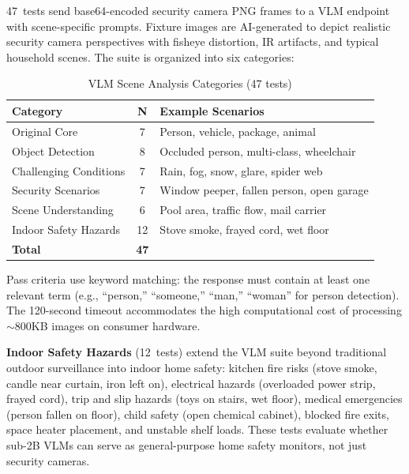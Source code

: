 \documentclass[onecolumn,10pt]{IEEEtran}
\begin{document}
47~tests send base64-encoded security camera PNG frames to a VLM
endpoint with scene-specific prompts. Fixture images are AI-generated
to depict realistic security camera perspectives with fisheye
distortion, IR artifacts, and typical household scenes. The
suite is organized into six categories:

\begin{table}[h]
\centering
\caption{VLM Scene Analysis Categories (47 tests)}
\label{tab:vlm_tests}
\begin{tabular}{p{3.2cm}cl}
\toprule
\textbf{Category} & \textbf{N} & \textbf{Example Scenarios} \\
\midrule
Original Core & 7 & Person, vehicle, package, animal \\
Object Detection & 8 & Occluded person, multi-class, wheelchair \\
Challenging Conditions & 7 & Rain, fog, snow, glare, spider web \\
Security Scenarios & 7 & Window peeper, fallen person, open garage \\
Scene Understanding & 6 & Pool area, traffic flow, mail carrier \\
Indoor Safety Hazards & 12 & Stove smoke, frayed cord, wet floor \\
\midrule
\textbf{Total} & \textbf{47} & \\
\bottomrule
\end{tabular}
\end{table}

Pass criteria use keyword matching: the response must contain at least
one relevant term (e.g., ``person,'' ``someone,'' ``man,'' ``woman''
for person detection). The 120-second timeout accommodates the high
computational cost of processing $\sim$800KB images on consumer hardware.

\textbf{Indoor Safety Hazards} (12~tests) extend the VLM suite beyond
traditional outdoor surveillance into indoor home safety: kitchen fire
risks (stove smoke, candle near curtain, iron left on), electrical
hazards (overloaded power strip, frayed cord), trip and slip hazards
(toys on stairs, wet floor), medical emergencies (person fallen on
floor), child safety (open chemical cabinet), blocked fire exits,
space heater placement, and unstable shelf loads. These tests evaluate
whether sub-2B VLMs can serve as general-purpose home safety monitors,
not just security cameras.

\end{document}
